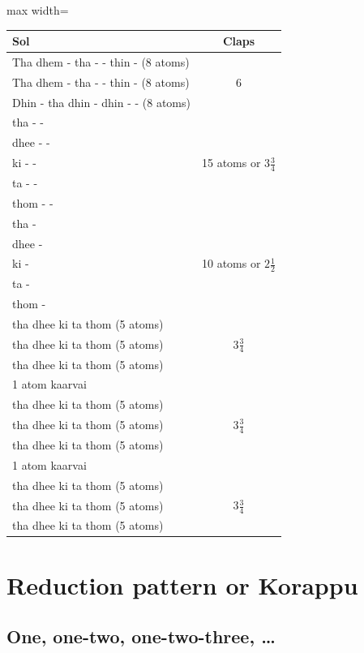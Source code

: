 \begin{center}
\begin{adjustbox}{max width=\textwidth}
\begin{tabular}{l c}
\toprule
Sol & Claps\\
\midrule
Tha dhem - tha - - thin - (8 atoms)  & \multirow{3}{*}{6}\\
Tha dhem - tha - - thin - (8 atoms)  & \\
Dhin - tha dhin - dhin - - (8 atoms) & \\
\midrule
tha - -   & \multirow{5}{*}{15 atoms or $3\frac{3}{4}$}\\
dhee - -  & \\
ki - -    & \\
ta - -    & \\
thom - -  & \\
\midrule
tha -   & \multirow{5}{*}{10 atoms or $2\frac{1}{2}$}\\
dhee -  & \\
ki -    & \\
ta -    & \\
thom -  & \\
\midrule
tha dhee ki ta thom (5 atoms) & \multirow{3}{*}{$3\frac{3}{4}$}\\
tha dhee ki ta thom (5 atoms) & \\
tha dhee ki ta thom (5 atoms) & \\
1 atom kaarvai                & \\
\midrule
tha dhee ki ta thom (5 atoms) & \multirow{3}{*}{$3\frac{3}{4}$}\\
tha dhee ki ta thom (5 atoms) & \\
tha dhee ki ta thom (5 atoms) & \\
1 atom kaarvai                & \\
\midrule
tha dhee ki ta thom (5 atoms) & \multirow{3}{*}{$3\frac{3}{4}$}\\
tha dhee ki ta thom (5 atoms) & \\
tha dhee ki ta thom (5 atoms) & \\
\bottomrule
\end{tabular}
\end{adjustbox}
\end{center}

\section{Reduction pattern or Korappu}

\subsection{One, one-two, one-two-three, \ldots}


